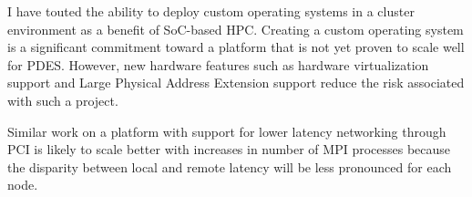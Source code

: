 \documentclass[11pt]{book}
\begin{document}
I have touted the ability to deploy custom operating systems in a cluster
environment as a benefit of SoC-based HPC. Creating a custom operating
system is a significant commitment toward a platform that is not yet proven to
scale well for PDES. However, new hardware features such as hardware
virtualization support and Large Physical Address Extension support reduce the
risk associated with such a project.

Similar work on a platform with support for lower latency networking through PCI
is likely to scale better with increases in number of MPI processes because the
disparity between local and remote latency will be less pronounced for each
node.

\newpage
 
\end{document}
